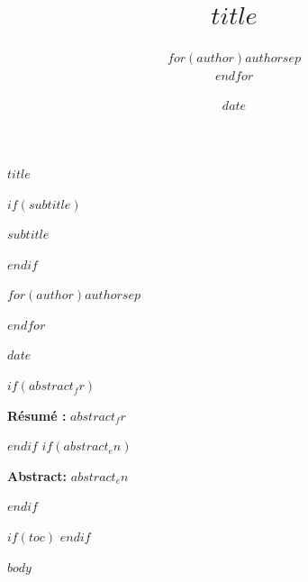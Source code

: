 \documentclass[11pt]{article}
\title{$title$}
\author{$for(author)$$author$$sep$ \\ $endfor$}
\date{$date$}
\renewcommand{\maketitle}{
  \begin{center}
  \vspace*{3cm}
  
  {\Huge\bfseries $title$\par}
  
  \vspace{2cm}
  
  $if(subtitle)$
  {\Large\itshape $subtitle$\par}
  $endif$
  
  \vspace{6cm}
  
  {\Large
  $for(author)$$author$$sep$ \par $endfor$
  \par}
  
  \vspace{5cm}
  
  {\large $date$\par}
  
  
  \end{center}
  \clearpage  %
}
\begin{document}
\maketitle
\thispagestyle{firstpage}

$if(abstract_fr)$
\begin{center}
\begin{minipage}{0.85\textwidth}
\noindent \textbf{Résumé :} $abstract_fr$
\end{minipage}
\end{center}
\vspace{0.5cm}
$endif$
$if(abstract_en)$
\begin{center}
\begin{minipage}{0.85\textwidth}
\noindent \textbf{Abstract:} $abstract_en$
\end{minipage}
\end{center}
\vspace{1cm}
$endif$


$if(toc)$
\tableofcontents
\clearpage        %
$endif$

\clearpage
\pagestyle{fancy}

$body$
\end{document}
